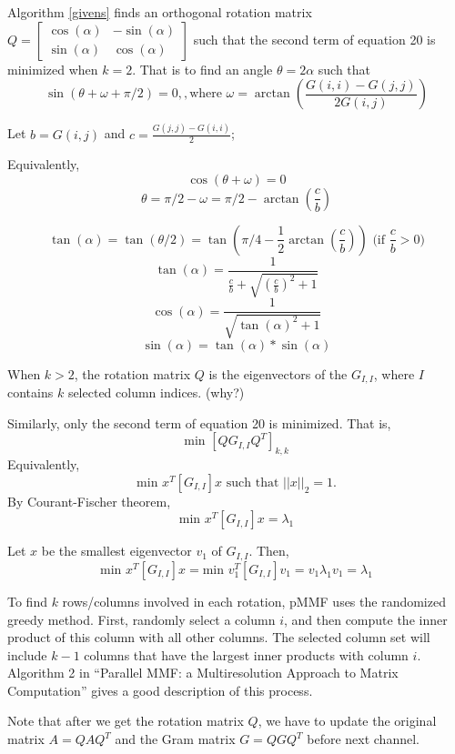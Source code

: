 \documentclass[a4paper]{article}
\begin{document}
Algorithm \ref{givens} finds an orthogonal rotation matrix $Q = \begin{bmatrix}
\cos(\alpha) & -\sin(\alpha) \\
\sin(\alpha)  & \cos(\alpha)
\end{bmatrix}$
 such that the second term of equation 20 is minimized when $k = 2$. That is to find an angle $\theta = 2\alpha$ such that $$\sin(\theta + \omega +\pi/2) = 0,, \text{where } \omega = \arctan(\frac{G(i,i) - G(j,j)}{2G(i,j)})$$
 
 Let $b = G(i, j)$ and $c = \frac{G(j, j) - G(i, i)}{2}$;
 
 Equivalently,
 $$\cos(\theta + \omega) = 0$$
 $$\theta = \pi/2-\omega = \pi/2 - \arctan(\frac{c}{b})$$
 
$$\tan(\alpha) = \tan(\theta/2) = \tan(\pi/4 - \frac{1}{2}\arctan(\frac{c}{b})) \text{     (if }\frac{c}{b}>0)$$
$$\tan(\alpha) = \frac{1}{\frac{c}{b} + \sqrt{(\frac{c}{b})^2 +1}}$$
$$\cos(\alpha) = \frac{1}{\sqrt{\tan(\alpha)^2 + 1}}$$
$$\sin(\alpha) = \tan(\alpha)*\sin(\alpha)$$

When $k>2$, the rotation matrix $Q$ is the eigenvectors of the $G_{I,I}$, where $I$ contains $k$ selected column indices. (why?)

Similarly, only the second term of equation 20 is minimized. That is,
$$\text{min } [QG_{I,I}Q^T]_{k,k}$$
Equivalently, $$\text{min } x^T[G_{I,I}]x \text{ such that } ||x||_2 = 1.$$
By Courant-Fischer theorem, $$\text{min } x^T[G_{I,I}]x = \lambda_1$$

Let $x$ be the smallest eigenvector $v_1$ of $G_{I,I}$. Then,
$$\text{min } x^T[G_{I,I}]x = \text{min } v_1^T[G_{I,I}]v_1 = v_1\lambda_1v_1 = \lambda_1$$


To find $k$ rows/columns involved in each rotation, pMMF uses the randomized greedy method. First, randomly select a column $i$, and then compute the inner product of this column with all other columns. The selected column set will include $k-1$ columns that have the largest inner products with column $i$. Algorithm 2 in ``Parallel MMF: a Multiresolution Approach to Matrix Computation'' gives a good description of this process.

Note that after we get the rotation matrix $Q$, we have to update the original matrix $A= QAQ^T$ and the Gram matrix $G = QGQ^T$ before next channel.
\end{document}
